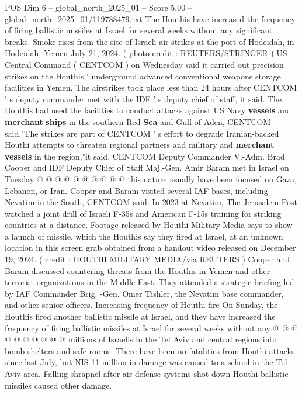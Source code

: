 \begin{textsample}{POS Dim 6 – global\_north\_2025\_01 – Score 5.00 – global\_north\_2025\_01/119788479.txt}  \label{ex:f6_pos_348}
The Houthis have increased the frequency of firing ballistic missiles at Israel for several weeks without any significant breaks.
Smoke rises from the site of Israeli air strikes at the port of Hodeidah, in Hodeidah, Yemen July 21, 2024. ( photo credit : REUTERS/STRINGER ) US Central Command ( CENTCOM ) on Wednesday said it carried out precision strikes on the Houthis ' underground advanced conventional weapons storage facilities in Yemen.
The airstrikes took place less than 24 hours after CENTCOM ' s deputy commander met with the IDF ' s deputy chief of staff, it said.
The Houthis had used the facilities to conduct attacks against US Navy \textbf{vessels} and \textbf{merchant} \textbf{ships} in the southern Red \textbf{Sea} and Gulf of Aden, CENTCOM said."The strikes are part of CENTCOM ' s effort to degrade Iranian-backed Houthi attempts to threaten regional partners and military and \textbf{merchant} \textbf{vessels} in the region,"it said.
CENTCOM Deputy Commander V.-Adm.
Brad Cooper and IDF Deputy Chief of Staff Maj.-Gen.
Amir Baram met in Israel on Tuesday @ @ @ @ @ @ @ @ @ @ this nature usually have been focused on Gaza, Lebanon, or Iran.
Cooper and Baram visited several IAF bases, including Nevatim in the South, CENTCOM said.
In 2023 at Nevatim, The Jerusalem Post watched a joint drill of Israeli F-35s and American F-15s training for striking countries at a distance.
Footage released by Houthi Military Media says to show a launch of missile, which the Houthis say they fired at Israel, at an unknown location in this screen grab obtained from a handout video released on December 19, 2024. ( credit : HOUTHI MILITARY MEDIA/via REUTERS ) Cooper and Baram discussed countering threats from the Houthis in Yemen and other terrorist organizations in the Middle East.
They attended a strategic briefing led by IAF Commander Brig. -Gen.
Omer Tishler, the Nevatim base commander, and other senior officers.
Increasing frequency of Houthi fire On Sunday, the Houthis fired another ballistic missile at Israel, and they have increased the frequency of firing ballistic missiles at Israel for several weeks without any @ @ @ @ @ @ @ @ @ @ millions of Israelis in the Tel Aviv and central regions into bomb shelters and safe rooms.
There have been no fatalities from Houthi attacks since last July, but NIS 11 million in damage was caused to a school in the Tel Aviv area.
Falling shrapnel after air-defense systems shot down Houthi ballistic missiles caused other damage.

\end{textsample}
